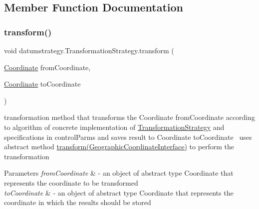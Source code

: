\subsection{Member Function Documentation}
\mbox{\label{classdatumstrategy_1_1_transformation_strategy_a99e23d291f37ed720a9e31d33f54c834}} 
\subsubsection{\texorpdfstring{transform()}{transform()}\hspace{0.1cm}{\footnotesize\ttfamily [1/2]}}
{\footnotesize\ttfamily void datumstrategy.\+Transformation\+Strategy.\+transform (\begin{DoxyParamCaption}\item[{\hyperlink{classcoordinates_1_1_coordinate}{Coordinate}}]{from\+Coordinate,  }\item[{\hyperlink{classcoordinates_1_1_coordinate}{Coordinate}}]{to\+Coordinate }\end{DoxyParamCaption})}



transformation method that transforms the Coordinate from\+Coordinate according to algorithm of concrete implementation of \hyperlink{classdatumstrategy_1_1_transformation_strategy}{Transformation\+Strategy} and specifications in control\+Parms and saves result to Coordinate to\+Coordinate~\newline
 uses abstract method \hyperlink{classdatumstrategy_1_1_transformation_strategy_a0fd1d6fbba01e5222360740e34eae786}{transform(\+Geographic\+Coordinate\+Interface)} to perform the transformation 


\begin{DoxyParams}{Parameters}
{\em from\+Coordinate} & -\/ an object of abstract type Coordinate that represents the coordinate to be transformed\\
\hline
{\em to\+Coordinate} & -\/ an object of abstract type Coordinate that represents the coordinate in which the results should be stored \\
\hline
\end{DoxyParams}
\mbox{\label{classdatumstrategy_1_1_transformation_strategy_a0fd1d6fbba01e5222360740e34eae786}} 
